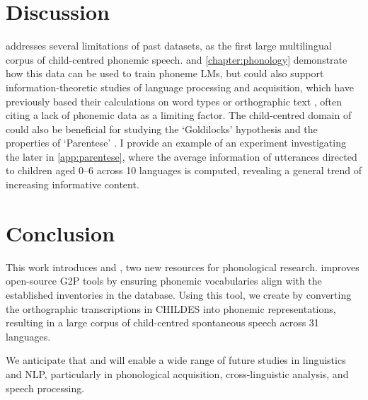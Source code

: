 \section{Discussion}

\ipachildes addresses several limitations of past datasets, as the first large multilingual corpus of child-centred phonemic speech.  and \cref{chapter:phonology} demonstrate how this data can be used to train phoneme LMs, but \ipachildes could also support information-theoretic studies of language processing and acquisition, which have previously based their calculations on word types \citep{piantadosi2011word, dautriche2017words, pimentel2020phonotactic} or orthographic text \citep{mahowald2013info, dautriche2017wordform, futrell2020lossy}, often citing a lack of phonemic data as a limiting factor. The child-centred domain of \ipachildes could also be beneficial for studying the `Goldilocks' hypothesis \citep{kidd2014goldilocks} and the properties of `Parentese' \citep{ramirez2017look}. I provide an example of an experiment investigating the later in \cref{app:parentese}, where the average information of utterances directed to children aged 0--6 across 10 languages is computed, revealing a general trend of increasing informative content.

\section{Conclusion}

This work introduces \gpp and \ipachildes, two new resources for phonological research. \gpp improves open-source G2P tools by ensuring phonemic vocabularies align with the established inventories in the \phoible database. Using this tool, we create \ipachildes by converting the orthographic transcriptions in CHILDES into phonemic representations, resulting in a large corpus of child-centred spontaneous speech across 31 languages.

We anticipate that \gpp and \ipachildes will enable a wide range of future studies in linguistics and NLP, particularly in phonological acquisition, cross-linguistic analysis, and speech processing.




